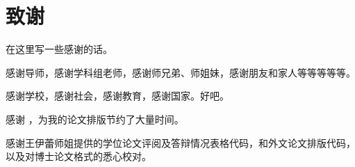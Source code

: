 
\chapter{致\hspace{1em}谢}

在这里写一些感谢的话。

感谢导师，感谢学科组老师，感谢师兄弟、师姐妹，感谢朋友和家人等等等等等。

感谢学校，感谢社会，感谢教育，感谢国家。好吧。

感谢 \sduthesis{}，为我的论文排版节约了大量时间。

感谢王伊蕾师姐提供的学位论文评阅及答辩情况表格代码，和外文论文排版代码，以及对博士论文格式的悉心校对。

